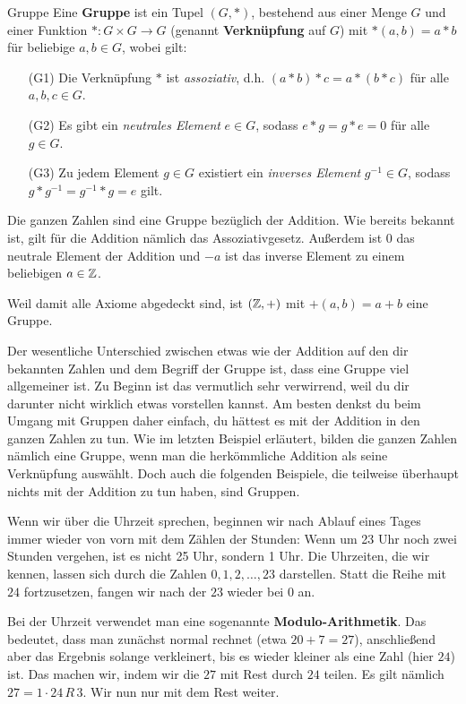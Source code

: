 \documentclass[../../main.tex]{subfiles}
\begin{document}
\begin{definition}{Gruppe}
    Eine \textbf{Gruppe} ist ein Tupel $(G,*)$, bestehend aus einer Menge $G$ und einer Funktion $*\colon G\times G\rightarrow G$ (genannt \textbf{Verknüpfung} auf $G$) mit $*(a,b)=a*b$ für beliebige $a,b \in G$, wobei gilt:
    \begin{enumerate}
        \item[(G1)] Die Verknüpfung $*$ ist \emph{assoziativ}, d.h. $(a*b)*c=a*(b*c)$ für alle $a,b,c\in G$.
        \item[(G2)] Es gibt ein \emph{neutrales Element} $e\in G$, sodass $e*g=g*e=0$ für alle $g\in G$.
        \item[(G3)] Zu jedem Element $g\in G$ existiert ein \emph{inverses Element} $g^{-1}\in G$, sodass $g*g^{-1}=g^{-1}*g=e$ gilt.
    \end{enumerate}
\end{definition}
\begin{example}{}
    Die ganzen Zahlen \Integer{} sind eine Gruppe bezüglich der Addition. Wie bereits bekannt ist, gilt für die Addition nämlich das Assoziativgesetz. Außerdem ist 0 das neutrale Element der Addition und $-a$ ist das inverse Element zu einem beliebigen $a\in\mathbb{Z}$.
    
    Weil damit alle Axiome abgedeckt sind, ist $(\mathbb{Z},+)$ mit $+(a,b)=a+b$ eine Gruppe.
\end{example}
Der wesentliche Unterschied zwischen etwas wie der Addition auf den dir bekannten Zahlen und dem Begriff der Gruppe ist, dass eine Gruppe viel allgemeiner ist. Zu Beginn ist das vermutlich sehr verwirrend, weil du dir darunter nicht wirklich etwas vorstellen kannst. Am besten denkst du beim Umgang mit Gruppen daher einfach, du hättest es mit der Addition in den ganzen Zahlen zu tun. Wie im letzten Beispiel erläutert, bilden die ganzen Zahlen nämlich eine Gruppe, wenn man die herkömmliche Addition als seine Verknüpfung auswählt. Doch auch die folgenden Beispiele, die teilweise überhaupt nichts mit der Addition zu tun haben, sind Gruppen.

\begin{example}{}
    Wenn wir über die Uhrzeit sprechen, beginnen wir nach Ablauf eines Tages immer wieder von vorn mit dem Zählen der Stunden: Wenn um 23 Uhr noch zwei Stunden vergehen, ist es nicht 25 Uhr, sondern 1 Uhr. Die Uhrzeiten, die wir kennen, lassen sich durch die Zahlen $0,1,2,\dots,23$ darstellen. Statt die Reihe mit $24$ fortzusetzen, fangen wir nach der $23$ wieder bei $0$ an.
    
    Bei der Uhrzeit verwendet man eine sogenannte \textbf{Modulo-Arithmetik}. Das bedeutet, dass man zunächst normal rechnet (etwa $20+7=27$), anschließend aber das Ergebnis solange verkleinert, bis es wieder kleiner als eine Zahl (hier $24$) ist. Das machen wir, indem wir die $27$ mit Rest durch $24$ teilen. Es gilt nämlich $27=1\cdot 24\,R\,3$. Wir nun nur mit dem Rest weiter.
\end{example}
\end{document}
